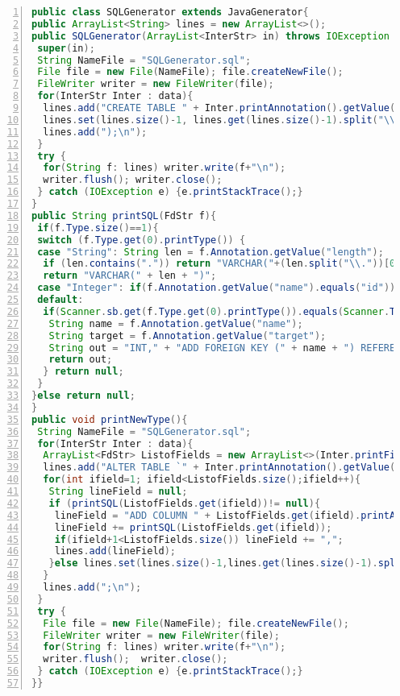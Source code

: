 \documentclass[10pt]{report}
\begin{document}
\label{SQLGenerator}
\begin{lstlisting}[numbers=left,language=Java,frame=single,breaklines=true,label=Code:ZeroIn, caption=SQL Generator.]
public class SQLGenerator extends JavaGenerator{
public ArrayList<String> lines = new ArrayList<>();
public SQLGenerator(ArrayList<InterStr> in) throws IOException {
 super(in);
 String NameFile = "SQLGenerator.sql";
 File file = new File(NameFile); file.createNewFile();
 FileWriter writer = new FileWriter(file); 
 for(InterStr Inter : data){	
  lines.add("CREATE TABLE " + Inter.printAnnotation().getValue("name") + " ( id INT NOT NULL PRIMARY KEY");
  lines.set(lines.size()-1, lines.get(lines.size()-1).split("\\,")[0]);
  lines.add(");\n");
 }
 try {
  for(String f: lines) writer.write(f+"\n");
  writer.flush(); writer.close();
 } catch (IOException e) {e.printStackTrace();}
}
public String printSQL(FdStr f){
 if(f.Type.size()==1){
 switch (f.Type.get(0).printType()) {
 case "String": String len = f.Annotation.getValue("length");
  if (len.contains(".")) return "VARCHAR("+(len.split("\\."))[0]+")";
  return "VARCHAR(" + len + ")";
 case "Integer": if(f.Annotation.getValue("name").equals("id")) return "INT";
 default:
  if(Scanner.sb.get(f.Type.get(0).printType()).equals(Scanner.TKT.NEWTYPE) && f.Annotation.getValue("target").equals(f.Type.get(0).printType())){
   String name = f.Annotation.getValue("name");
   String target = f.Annotation.getValue("target");
   String out = "INT," + "ADD FOREIGN KEY (" + name + ") REFERENCES `" + target.toLowerCase() + "`(`id`)";
   return out;
  } return null;
 }
}else return null;
}
public void printNewType(){
 String NameFile = "SQLGenerator.sql";
 for(InterStr Inter : data){	
  ArrayList<FdStr> ListofFields = new ArrayList<>(Inter.printField());
  lines.add("ALTER TABLE `" + Inter.printAnnotation().getValue("name") + "` ");			
  for(int ifield=1; ifield<ListofFields.size();ifield++){
   String lineField = null;
   if (printSQL(ListofFields.get(ifield))!= null){
    lineField = "ADD COLUMN " + ListofFields.get(ifield).printAnnotaion().getValue("name") + " ";
    lineField += printSQL(ListofFields.get(ifield));
    if(ifield+1<ListofFields.size()) lineField += ",";
    lines.add(lineField);	
   }else lines.set(lines.size()-1,lines.get(lines.size()-1).split("\\,")[0]);
  }
  lines.add(";\n");
 }
 try {
  File file = new File(NameFile); file.createNewFile();
  FileWriter writer = new FileWriter(file); 
  for(String f: lines) writer.write(f+"\n");
  writer.flush();  writer.close();
 } catch (IOException e) {e.printStackTrace();}
}}
\end{lstlisting}
\end{document}
